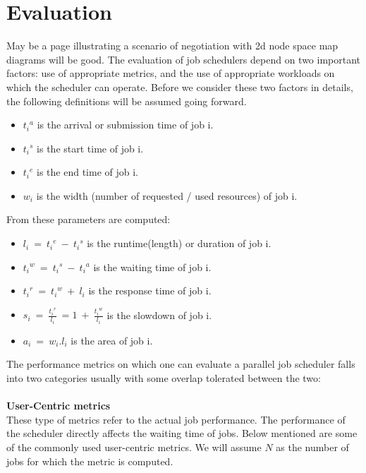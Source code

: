 \chapter{Evaluation}\label{chapter:evaluation}
May be a page illustrating a scenario of negotiation with 2d node space map diagrams will be good.
The evaluation of job schedulers depend on two important factors: use of appropriate metrics, and the use of appropriate workloads on which the scheduler can operate. Before we consider these two factors in details, the following definitions will be assumed going forward.
\begin{itemize}
\item \textit{${t_{i}}^{a}$} is the arrival or submission time of job i.
\item \textit{${t_{i}}^{s}$} is the start time of job i.
\item \textit{${t_{i}}^{e}$} is the end time of job i.
\item \textit{$w_{i}$} is the width (number of requested / used resources) of job i.
\end{itemize}
From these parameters are computed:
\begin{itemize}
\item \textit{$l_{i}\ =\ {t_{i}}^{e}\ -\ {t_{i}}^{s}$} is the runtime(length) or duration of job i.
\item \textit{${t_{i}}^{w}\ =\ {t_{i}}^{s}\ -\ {t_{i}}^{a}$} is the waiting time of job i.
\item \textit{${t_{i}}^{r}\ =\ {t_{i}}^{w}\ +\ l_{i}$} is the response time of job i.
\item \textit{$s_{i}\ =\ \frac{{t_{i}}^{r}}{l_{i}}\ = 1\ +\ \frac{{t_{i}}^{w}}{l_{i}}$} is the slowdown of job i.
\item \textit{$a_{i}\ =\ w_{i}.l_{i}$} is the area of job i.
\end{itemize}
The performance metrics on which one can evaluate a parallel job scheduler falls into two categories usually with some overlap tolerated between the two:\\ \\
\textbf{User-Centric metrics}\\
These type of metrics refer to the actual job performance. The performance of the scheduler directly affects the waiting time of jobs. Below mentioned are some of the commonly used user-centric metrics. We will assume $N$ as the number of jobs for which the metric is computed.
